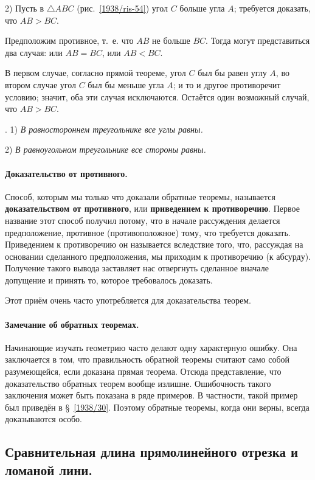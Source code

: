 \documentclass[oneside]{book}
\begin{document}
2) Пусть в $\triangle ABC$ (рис.~\ref{1938/ris-54})
угол $C$ больше угла $A$;
требуется доказать, что $AB > BC$.

Предположим противное, т.~е. что $AB$ не больше $BC$.
Тогда могут представиться два случая:
или $AB=BC$, или $AB<BC$.

В первом случае, согласно прямой теореме, угол $C$ был бы равен углу $A$, во втором случае угол $C$ был бы меньше угла $A$;
и то и другое противоречит условию;
значит, оба эти случая исключаются.
Остаётся один возможный случай, что $AB>BC$.

\mbox{.}
1) \emph{В равностороннем треугольнике все углы равны.}

2) \emph{В равноугольном треугольнике все стороны равны.}

\paragraph{Доказательство от противного.}\label{1938/48}
Способ, которым мы только что доказали обратные теоремы, называется \textbf{доказательством от противного}, или \textbf{приведением к противоречию}.
Первое название этот способ получил потому, что в начале рассуждения делается предположение, противное (противоположное) тому, что требуется доказать.
Приведением к противоречию он называется вследствие того, что, рассуждая на основании сделанного предположения, мы приходим к противоречию (к абсурду).
Получение такого вывода заставляет нас отвергнуть сделанное вначале допущение и принять то, которое требовалось доказать.

Этот приём очень часто употребляется для доказательства теорем.

\paragraph{Замечание об обратных теоремах.}\label{1938/49}
Начинающие изучать геометрию часто делают одну характерную ошибку.
Она заключается в том, что правильность обратной теоремы считают само собой разумеющейся, если доказана прямая теорема.
Отсюда представление, что доказательство обратных теорем вообще излишне.
Ошибочность такого заключения может быть показана в ряде примеров.
В частности, такой пример был приведён в §~\ref{1938/30}.
Поэтому обратные теоремы, когда они верны, всегда доказываются особо.



\subsection*{Сравнительная длина прямолинейного отрезка и ломаной лини.}
\end{document}
